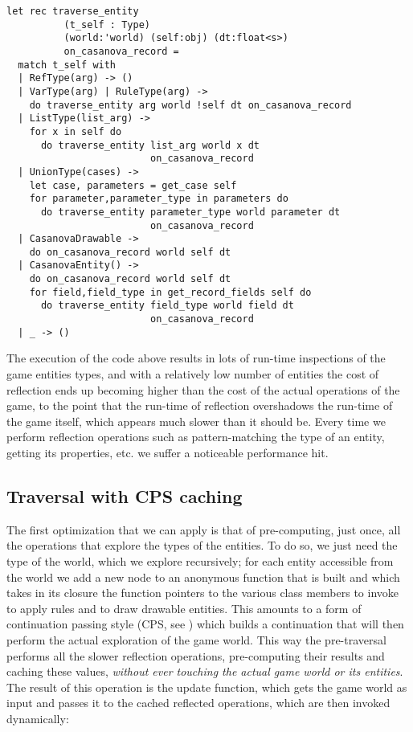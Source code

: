 \begin{lstlisting}
let rec traverse_entity 
          (t_self : Type) 
          (world:'world) (self:obj) (dt:float<s>) 
          on_casanova_record =   
  match t_self with
  | RefType(arg) -> ()
  | VarType(arg) | RuleType(arg) ->
    do traverse_entity arg world !self dt on_casanova_record
  | ListType(list_arg) -> 
    for x in self do
      do traverse_entity list_arg world x dt 
                         on_casanova_record
  | UnionType(cases) ->
    let case, parameters = get_case self
    for parameter,parameter_type in parameters do
      do traverse_entity parameter_type world parameter dt 
                         on_casanova_record
  | CasanovaDrawable ->
    do on_casanova_record world self dt
  | CasanovaEntity() ->
    do on_casanova_record world self dt
    for field,field_type in get_record_fields self do
      do traverse_entity field_type world field dt 
                         on_casanova_record
  | _ -> ()
\end{lstlisting}

The execution of the code above results in lots of run-time inspections of the game entities types, and with a relatively low number of entities the cost of reflection ends up becoming higher than the cost of the actual operations of the game, to the point that the run-time of reflection overshadows the run-time of the game itself, which appears much slower than it should be. Every time we perform reflection operations such as pattern-matching the type of an entity, getting its properties, etc. we suffer a noticeable performance hit.

\subsection{Traversal with CPS caching}
The first optimization that we can apply is that of pre-computing, just once, all the operations that explore the types of the entities. To do so, we just need the type of the world, which we explore recursively; for each entity accessible from the world we add a new node to an anonymous function that is built and which takes in its closure the function pointers to the various class members to invoke to apply rules and to draw drawable entities. This amounts to a form of continuation passing style (CPS, see \cite{CHAPTER_6_CPS}) which builds a continuation that will then perform the actual exploration of the game world. This way the pre-traversal performs all the slower reflection operations, pre-computing their results and caching these values, \textit{without ever touching the actual game world or its entities}. The result of this operation is the update function, which gets the game world as input and passes it to the cached reflected operations, which are then invoked dynamically:

